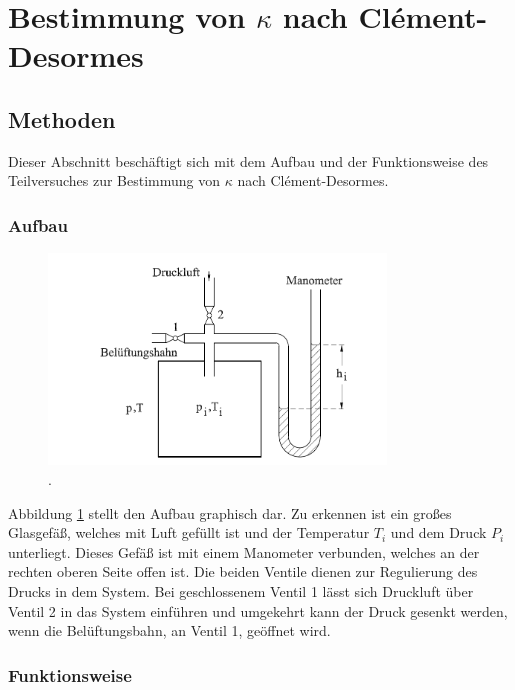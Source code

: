 \section{Bestimmung von $\kappa$ nach Clément-Desormes}
	
	\subsection{Methoden}
		
		Dieser Abschnitt beschäftigt sich mit dem Aufbau und der Funktionsweise des Teilversuches zur Bestimmung von $\kappa$ nach Clément-Desormes.
				
		\subsubsection{Aufbau}

			\begin{figure}[ht]
				\centering
				\includegraphics[width=0.8\textwidth]{bilder/aufbau_v2.png}
				\caption{.\cite{WWU}} %
				\label{fig:AufbauV2}	
			\end{figure}
			Abbildung \ref{fig:AufbauV2} stellt den Aufbau graphisch dar.
			Zu erkennen ist ein großes Glasgefäß, welches mit Luft gefüllt ist und der Temperatur $T_i$ und dem Druck $P_i$ unterliegt.
			Dieses Gefäß ist mit einem Manometer verbunden, welches an der rechten oberen Seite offen ist.
			Die beiden Ventile dienen zur Regulierung des Drucks in dem System.
			Bei geschlossenem Ventil 1 lässt sich Druckluft über Ventil 2 in das System einführen und umgekehrt kann der Druck gesenkt werden, wenn die Belüftungsbahn, an Ventil 1, geöffnet wird.
			
		\subsubsection{Funktionsweise}
			
